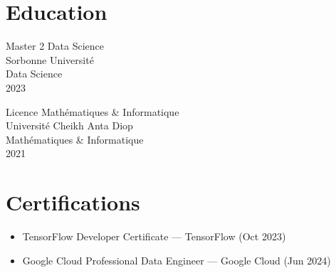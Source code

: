\documentclass[10pt,letterpaper]{article}
\begin{document}
\begin{paracol}{2}
\begin{rightcolumn}
\vspace{0.9in}
\section*{Education}
\begin{tcolorbox}[colback=white,boxrule=1pt,colframe=primary]
  Master 2 Data Science\\
  Sorbonne Université\\
  Data Science\\
  2023
\end{tcolorbox}

\begin{tcolorbox}[colback=white,boxrule=1pt,colframe=primary]
  Licence Mathématiques \& Informatique\\
  Université Cheikh Anta Diop\\
  Mathématiques \& Informatique\\
  2021
\end{tcolorbox}

\section*{Certifications}
\begin{itemize}
  \item TensorFlow Developer Certificate — TensorFlow (Oct 2023)
  \item Google Cloud Professional Data Engineer — Google Cloud (Jun 2024)
\end{itemize}

\end{rightcolumn}
\end{paracol}
\end{document}

